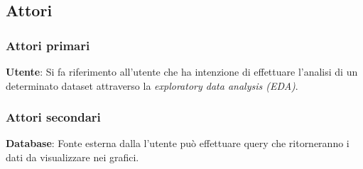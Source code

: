 \documentclass[../analisi_dei_requisiti.tex]{subfiles}
\begin{document}
%
\subsection{Attori}%
\label{subs:attori}

\subsubsection{Attori primari}%
\label{sssec:attori_primari}
\begin{description}
 \item \textbf{Utente}: Si fa riferimento all'utente che ha intenzione di effettuare l'analisi di un determinato dataset attraverso la \emph{exploratory data analysis (EDA)}.
\end{description}

\subsubsection{Attori secondari}
\label{sssec:attori_secondari}
\begin{description}
    \item \textbf{Database}: Fonte esterna dalla l'utente può effettuare query che ritorneranno i dati da visualizzare nei grafici.
\end{description}


\newpage

\newpage

\newpage

\newpage


\end{document}

